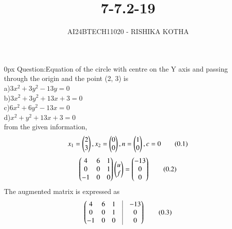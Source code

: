 \documentclass[journal]{IEEEtran}
\begin{document}

\vspace{3cm}

\title{7-7.2-19}
\author{AI24BTECH11020 - RISHIKA KOTHA}
{\let\newpage\relax\maketitle}

\renewcommand{\thefigure}{\theenumi}
\renewcommand{\thetable}{\theenumi}
\setlength{\intextsep}{10pt} %


\renewcommand{\thetable}{\theenumi}
\parindent 0px
Question:Equation of the circle with centre on the Y axis and passing through the origin and the point (2, 3) is
\\
a)$3x^2+3y^2-13y=0$\\
b)$3x^2+3y^2+13x+3=0$\\
c)$6x^2+6y^2-13x=0$\\
d)$x^2+y^2+13x+3=0$\\
\solution
from the given information,
\begin{align*}
	x_1=\begin{pmatrix}2\\3\end{pmatrix}, x_2=\begin{pmatrix}0\\0\end{pmatrix},n=\begin{pmatrix}1\\0\end{pmatrix},c=0 \tag{0.1}
\end{align*}
\begin{align*}
	\begin{pmatrix}4 & 6 & 1 \\
	       0 & 0 & 1 \\
	       -1 & 0 & 0\end{pmatrix}
	       \begin{pmatrix}u\\f\end{pmatrix}=\begin{pmatrix}-13\\0\\0\end{pmatrix}\tag{0.2}
\end{align*}
The augmented matrix is expressed as
\begin{align*}
	\myvec{4 & 6 & 1 & \vrule & -13\\
         0 &  0 & 1 & \vrule & 0\\
	 -1 &  0 & 0 & \vrule & 0} \tag{0.3}
\end{align*}
\end{document}
